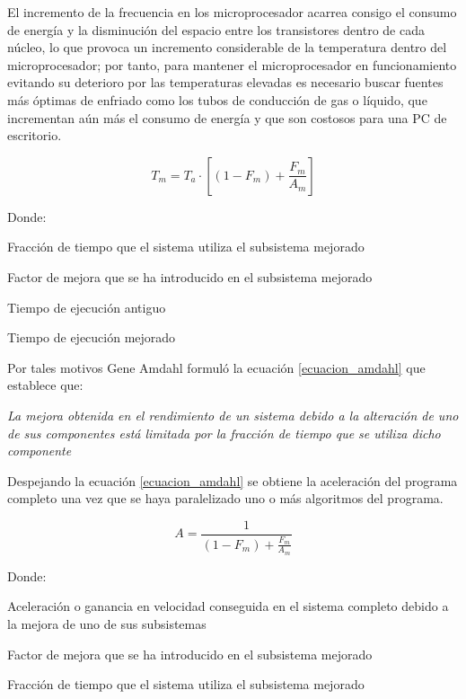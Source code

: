 \documentclass[../main/main.tex]{subfiles}
\begin{document}
  El incremento de la frecuencia en los microprocesador acarrea consigo el consumo de energía y la disminución del espacio entre los transistores dentro de cada núcleo, lo que provoca un incremento considerable de la temperatura dentro del microprocesador; por tanto, para mantener el microprocesador en funcionamiento evitando su deterioro por las temperaturas elevadas es necesario buscar fuentes más óptimas de enfriado como los tubos de conducción de gas o líquido, que incrementan aún más el consumo de energía y que son costosos para una PC de escritorio.

  \begin{equation}
    T_m = T_a \cdot [( 1 - F_m ) + \frac{F_m}{A_m}]
    \label{ecuacion_amdahl}
  \end{equation}

  Donde:

  \begin{description}
    \item[$F_m=$] Fracción de tiempo que el sistema utiliza el subsistema mejorado
    \item[$A_m=$] Factor de mejora que se ha introducido en el subsistema mejorado
    \item[$T_a=$] Tiempo de ejecución antiguo
    \item[$T_m=$] Tiempo de ejecución mejorado
  \end{description}

  Por tales motivos Gene Amdahl formuló la ecuación \ref{ecuacion_amdahl} que establece que:

  \textit{La mejora obtenida en el rendimiento de un sistema debido a la alteración de uno de sus componentes está limitada por la fracción de tiempo que se utiliza dicho componente}

  Despejando la ecuación \ref{ecuacion_amdahl} se obtiene la aceleración del programa completo una vez que se haya paralelizado uno o más algoritmos del programa.

  \begin{equation}
    A = \frac{1}{( 1 - F_m ) + \frac{F_m}{A_m}}
    \label{ecuacion_amdahl_aceleracion}
  \end{equation}

  Donde:

  \begin{description}
    \item[$A=$] Aceleración o ganancia en velocidad conseguida en el sistema completo debido a la mejora de uno de sus subsistemas
    \item[$A_m=$] Factor de mejora que se ha introducido en el subsistema mejorado
    \item[$F_m=$] Fracción de tiempo que el sistema utiliza el subsistema mejorado
  \end{description}
\end{document}

